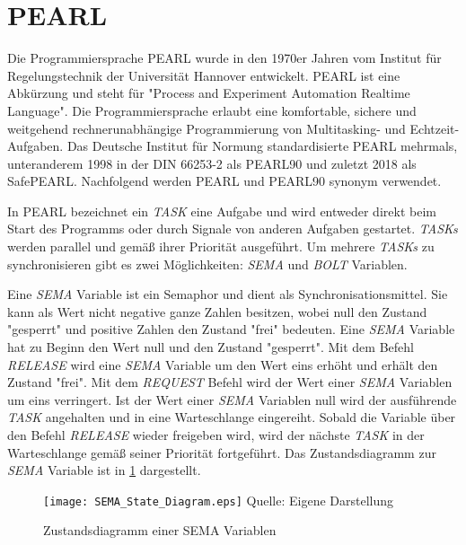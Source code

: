 \section{PEARL}
\label{section:PEARL}
Die Programmiersprache PEARL wurde in den 1970er Jahren vom Institut für
Regelungstechnik der Universität Hannover entwickelt. PEARL ist eine Abkürzung
und steht für "Process and Experiment Automation Realtime Language". Die
Programmiersprache erlaubt eine komfortable, sichere und weitgehend
rechnerunabhängige Programmierung von Multitasking- und
Echtzeit-Aufgaben.\autocite{PEARLHistory} Das Deutsche Institut für Normung
standardisierte PEARL mehrmals, unteranderem 1998 in der DIN 66253-2 als
PEARL90\autocite{DIN-66253-2:1998-04} und zuletzt 2018 als
SafePEARL\autocite{DIN-66253:2018-03}. Nachfolgend werden PEARL und PEARL90
synonym verwendet.

In PEARL bezeichnet ein \emph{TASK} eine Aufgabe und wird entweder direkt beim
Start des Programms oder durch Signale von anderen Aufgaben gestartet.
\emph{TASKs} werden parallel und gemäß ihrer Priorität
ausgeführt.\autocite[vgl.][104]{PEARL} Um mehrere \emph{TASKs} zu
synchronisieren gibt es zwei Möglichkeiten: \emph{SEMA} und \emph{BOLT}
Variablen.\autocite[vgl.][120]{PEARL}

Eine \emph{SEMA} Variable ist ein Semaphor und dient als Synchronisationsmittel.
Sie kann als Wert nicht negative ganze Zahlen besitzen, wobei null den Zustand
"gesperrt" und positive Zahlen den Zustand "frei"
bedeuten.\autocite[vgl.][120]{PEARL} Eine \emph{SEMA} Variable hat zu Beginn den
Wert null und den Zustand "gesperrt". Mit dem Befehl \emph{RELEASE} wird eine
\emph{SEMA} Variable um den Wert eins erhöht und erhält den Zustand "frei". Mit
dem \emph{REQUEST} Befehl wird der Wert einer \emph{SEMA} Variablen um eins
verringert. Ist der Wert einer \emph{SEMA} Variablen null wird der ausführende
\emph{TASK} angehalten und in eine Warteschlange eingereiht. Sobald die Variable
über den Befehl \emph{RELEASE} wieder freigeben wird, wird der nächste
\emph{TASK} in der Warteschlange gemäß seiner Priorität
fortgeführt.\autocite[vgl.][120-121]{PEARL} Das Zustandsdiagramm zur \emph{SEMA}
Variable ist in \cref{fig:SEMA_StateDiagram} dargestellt.
\begin{figure}[ht]
  \texttt{[image: SEMA\_State\_Diagram.eps]}
  \footnotesize\sffamily Quelle: Eigene Darstellung
  \caption{Zustandsdiagramm einer SEMA Variablen}
  \label{fig:SEMA_StateDiagram}
\end{figure}

